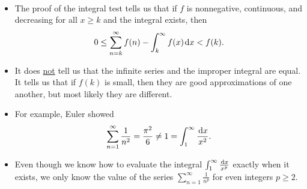 \begin{remark}\,
\begin{itemize}
\item The proof of the integral test tells us that if $f$ is nonnegative, continuous, and decreasing for all $x\ge k$ and the integral exists, then
\begin{equation*}
0\le \sum_{n=k}^\infty f(n) - \int_k^\infty f(x)\mkern 2mu \mathrm{d} x < f(k).
\end{equation*}
\item It does \underline{not} tell us that the infinite series and the improper integral are equal.  
It tells us that if $f(k)$ is small, then they are good approximations of one another, but most likely they are different.
\item For example, Euler showed
\begin{equation*}
\sum_{n=1}^\infty\frac{1}{n^2} = \frac{\pi^2}{6} \ne 1 = \int_1^\infty\frac{\mkern 2mu \mathrm{d} x}{x^2}.
\end{equation*}
\item Even though we know how to evaluate the integral $\int_1^\infty\frac{\mkern 2mu \mathrm{d} x}{x^p}$ exactly when it exists,
we only know the value of the series $\sum_{n=1}^\infty\frac{1}{n^p}$ for even integers $p\ge 2$.
\end{itemize}
\end{remark}

\newpage

